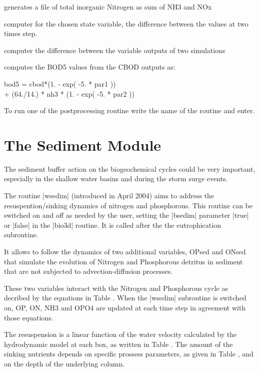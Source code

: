 generates a file of total inorganic Nitrogen as sum of NH3 and 
NOx

computer for the chosen state variable, the difference between 
the values at two times step. 


computer the difference between the variable outputs of two simulations 



computes the BOD5 values from the CBOD outputs as:

\begin{center}
\begin{verb}
bod5 = cbod*(1. - exp( -5. * par1 ))
\\
        + (64./14.) * nh3 * (1. - exp( -5. * par2 ))
\end{verb}
\end{center}

To run one of the postprocessing routine write the name of the 
routine and enter.




\section{The Sediment Module}

The sediment buffer action on the biogeochemical cycles could 
be very important, especially in the shallow water basins and 
during the storm surge events.

The routine |wsedim| (introduced in April 2004) aims to address 
the resuspention/sinking dynamics of nitrogen and phosphorous.
This routine can be switched on and off as needed by the user, 
setting the |bsedim| parameter |true| or |false| in the |bio3d| 
routine. It is called after the the eutrophication subroutine.

It allows to follow the dynamics of two additional variables, 
OPsed and ONsed that simulate the evolution of Nitrogen and Phosphorous 
detritus in sediment that are not subjected to advection-diffusion 
processes.

These two variables interact with the Nitrogen and Phosphorous 
cycle as decribed by the equations in Table \STone. When 
the |wsedim| subroutine is switched on, OP, ON, NH3 and OPO4 are 
updated at each time step in agreement with those equations.

The resuspension is a linear function of the water velocity calculated 
by the hydrodynamic model at each box, as written in Table \STtwoa. 
The amount of the sinking nutrients depends on specific prossess 
parameters, as given in Table \STtwoa, and on the depth of the underlying 
column.





%
